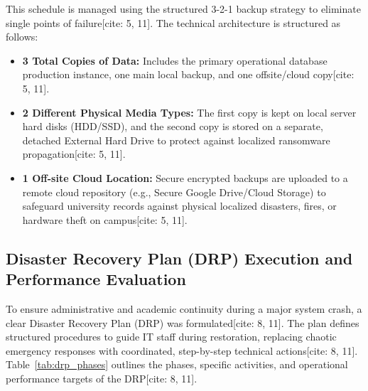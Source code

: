 \documentclass[journal,onecolumn,12pt,twoside]{IEEEtran}
\begin{document}
	This schedule is managed using the structured 3-2-1 backup strategy to eliminate single points of failure[cite: 5, 11]. The technical architecture is structured as follows:
	\begin{itemize}
		\item \textbf{3 Total Copies of Data:} Includes the primary operational database production instance, one main local backup, and one offsite/cloud copy[cite: 5, 11].
		\item \textbf{2 Different Physical Media Types:} The first copy is kept on local server hard disks (HDD/SSD), and the second copy is stored on a separate, detached External Hard Drive to protect against localized ransomware propagation[cite: 5, 11].
		\item \textbf{1 Off-site Cloud Location:} Secure encrypted backups are uploaded to a remote cloud repository (e.g., Secure Google Drive/Cloud Storage) to safeguard university records against physical localized disasters, fires, or hardware theft on campus[cite: 5, 11].
	\end{itemize}
	
	\subsection{Disaster Recovery Plan (DRP) Execution and Performance Evaluation}
	\label{subsec:results_drp}
	To ensure administrative and academic continuity during a major system crash, a clear Disaster Recovery Plan (DRP) was formulated[cite: 8, 11]. The plan defines structured procedures to guide IT staff during restoration, replacing chaotic emergency responses with coordinated, step-by-step technical actions[cite: 8, 11]. Table~\ref{tab:drp_phases} outlines the phases, specific activities, and operational performance targets of the DRP[cite: 8, 11].
	
\end{document}
